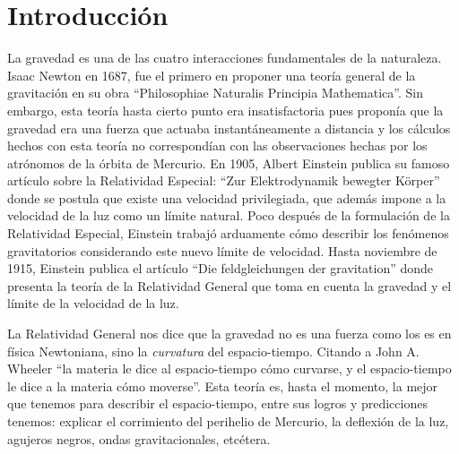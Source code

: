 \documentclass[11pt, letterpaper, spanish]{book}
\theoremstyle{definition}
\theoremstyle{plain}
\theoremstyle{remark}
\theoremstyle{break}
\begin{document}
\printnomenclature
\tableofcontents{}




\chapter*{Introducci\'{o}n}

La gravedad es una de las cuatro interacciones fundamentales de la naturaleza. Isaac Newton en 1687, fue el primero en proponer una teor\'{i}a general de la gravitaci\'{o}n en su obra ``Philosophiae Naturalis Principia Mathematica''. Sin embargo, esta teor\'{i}a hasta cierto punto era insatisfactoria pues propon\'{i}a que la gravedad era una fuerza que actuaba instant\'{a}neamente a distancia y los c\'{a}lculos hechos con esta teor\'{i}a no correspond\'{i}an con las observaciones hechas por los atr\'{o}nomos de la \'{o}rbita de Mercurio. En 1905, Albert Einstein publica su famoso art\'{i}culo sobre la Relatividad Especial: ``Zur Elektrodynamik bewegter K\"{o}rper'' donde se postula que existe una velocidad privilegiada, que adem\'{a}s impone a la velocidad de la luz como un l\'{i}mite natural. Poco despu\'{e}s de la formulaci\'{o}n de la Relatividad Especial, Einstein trabaj\'{o} arduamente c\'{o}mo describir los fen\'{o}menos gravitatorios considerando este nuevo l\'{i}mite de velocidad. Hasta noviembre de 1915, Einstein publica el art\'{i}culo  ``Die feldgleichungen der gravitation'' \cite{Einstein} donde presenta la teor\'{i}a de la Relatividad General que toma en cuenta la gravedad y el límite de la velocidad de la luz.

La Relatividad General nos dice que la gravedad no es una fuerza como los es en f\'{i}sica Newtoniana, sino la \emph{curvatura} del espacio-tiempo. Citando a John A. Wheeler ``la materia le dice al espacio-tiempo c\'{o}mo curvarse, y el espacio-tiempo le dice a la materia c\'{o}mo moverse''. Esta teor\'{i}a es, hasta el momento, la mejor que tenemos para describir el espacio-tiempo, entre sus logros y predicciones tenemos: explicar el corrimiento del perihelio de Mercurio, la deflexi\'{o}n de la luz, agujeros negros, ondas gravitacionales, etcétera.
\end{document}
